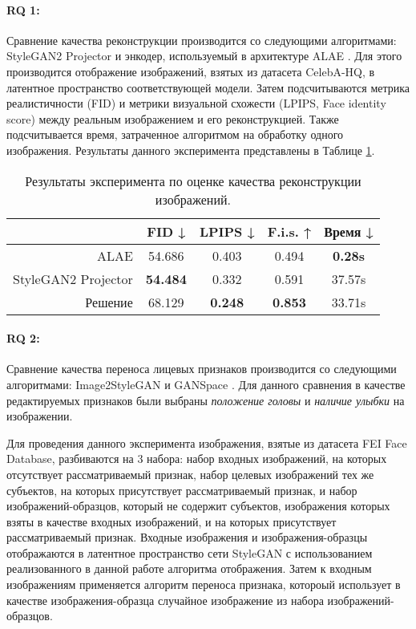 \paragraph{RQ 1:}
Сравнение качества реконструкции производится со следующими алгоритмами: StyleGAN2 Projector \cite{karras2020stylegan2} и энкодер, используемый в архитектуре ALAE \cite{ALAE}.
Для этого производится отображение изображений, взятых из датасета CelebA-HQ, в латентное пространство соответствующей модели.
Затем подсчитываются метрика реалистичности (FID) и метрики визуальной схожести (LPIPS, Face identity score) между реальным изображением и его реконструкцией.
Также подсчитывается время, затраченное алгоритмом на обработку одного изображения.
Результаты данного эксперимента представлены в Таблице \ref{tab:exp1}.

\begin{table}
\begin{center}
  \caption{Результаты эксперимента по оценке качества реконструкции изображений.}
  \label{tab:exp1}
  \begin{tabular}{ |r|c|c|c|c| } 
    \hline
      & FID ↓ & LPIPS ↓ & F.i.s. ↑ & Время ↓ \\ 
    \hline\hline
    ALAE    & 54.686 & 0.403 & 0.494 & \textbf{0.28s}  \\ 
    StyleGAN2 Projector 
            & \textbf{54.484} & 0.332 & 0.591 & 37.57s  \\ 
    Решение & 68.129 & \textbf{0.248} & \textbf{0.853} & 33.71s  \\ 
    \hline
  \end{tabular}
\end{center}
\end{table}

\paragraph{RQ 2:}
Сравнение качества переноса лицевых признаков производится со следующими алгоритмами: Image2StyleGAN \cite{abdal2019image2stylegan} и GANSpace \cite{hrknen2020ganspace}.
Для данного сравнения в качестве редактируемых признаков были выбраны \emph{положение головы} и \emph{наличие улыбки} на изображении.

Для проведения данного эксперимента изображения, взятые из датасета FEI Face Database, разбиваются на 3 набора: набор входных изображений, на которых отсутствует рассматриваемый признак, набор целевых изображений тех же субъектов, на которых присутствует рассматриваемый признак, и набор изображений-образцов, который не содержит субъектов, изображения которых взяты в качестве входных изображений, и на которых присутствует рассматриваемый признак.
Входные изображения и изображения-образцы отображаются в латентное пространство сети StyleGAN с использованием реализованного в данной работе алгоритма отображения.
Затем к входным изображениям применяется алгоритм переноса признака, котороый использует в качестве изображения-образца случайное изображение из набора изображений-образцов.

